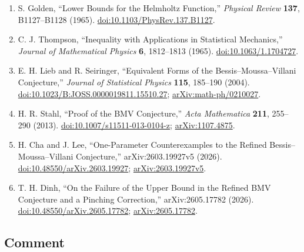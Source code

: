 \begin{enumerate}[label={},leftmargin=4.8em,labelsep=0.5em]
  \footnotesize
  \item[\textup{[Gol65]}]\label{ref:p34-golden}
  S. Golden, ``Lower Bounds for the Helmholtz Function,''
  \emph{Physical Review} \textbf{137}, B1127--B1128 (1965).\newline
  \href{https://doi.org/10.1103/PhysRev.137.B1127}{doi:10.1103/PhysRev.137.B1127}.

  \item[\textup{[Tho65]}]\label{ref:p34-thompson}
  C. J. Thompson, ``Inequality with Applications in Statistical Mechanics,''
  \emph{Journal of Mathematical Physics} \textbf{6}, 1812--1813 (1965).
  \href{https://doi.org/10.1063/1.1704727}{doi:10.1063/1.1704727}.

  \item[\textup{[LS04]}]\label{ref:p34-lieb-seiringer}
  E. H. Lieb and R. Seiringer, ``Equivalent Forms of the
  Bessis--Moussa--Villani Conjecture,'' \emph{Journal of Statistical Physics}
  \textbf{115}, 185--190 (2004).
  \href{https://doi.org/10.1023/B:JOSS.0000019811.15510.27}{doi:10.1023/B:JOSS.0000019811.15510.27};
  \href{https://arxiv.org/abs/math-ph/0210027}{arXiv:math-ph/0210027}.

  \item[\textup{[Sta13]}]\label{ref:p34-stahl}
  H. R. Stahl, ``Proof of the BMV Conjecture,''
  \emph{Acta Mathematica} \textbf{211}, 255--290 (2013).
  \href{https://doi.org/10.1007/s11511-013-0104-z}{doi:10.1007/s11511-013-0104-z};
  \href{https://arxiv.org/abs/1107.4875}{arXiv:1107.4875}.

  \item[\textup{[CL26]}]\label{ref:p34-cha-lee}
  H. Cha and J. Lee, ``One-Parameter Counterexamples to the Refined
  Bessis--Moussa--Villani Conjecture,'' arXiv:2603.19927v5 (2026).
  \href{https://doi.org/10.48550/arXiv.2603.19927}{doi:10.48550/arXiv.2603.19927};
  \href{https://arxiv.org/abs/2603.19927v5}{arXiv:2603.19927v5}.

  \item[\textup{[Din26]}]\label{ref:p34-dinh}
  T. H. Dinh, ``On the Failure of the Upper Bound in the Refined BMV
  Conjecture and a Pinching Correction,'' arXiv:2605.17782 (2026).
  \href{https://doi.org/10.48550/arXiv.2605.17782}{doi:10.48550/arXiv.2605.17782};
  \href{https://arxiv.org/abs/2605.17782}{arXiv:2605.17782}.
\end{enumerate}

\subsection*{Comment}

